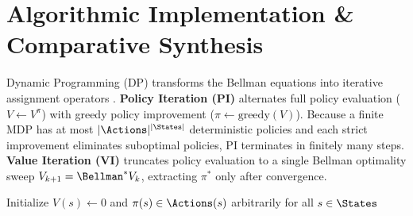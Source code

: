 \documentclass[../../../../master.tex]{subfiles}
\begin{document}
\section{Algorithmic Implementation \& Comparative Synthesis}\label{sec:mdp:algorithms}

Dynamic Programming (DP) transforms the Bellman equations into iterative assignment operators . \textbf{Policy Iteration (PI)} alternates full policy evaluation ($V \leftarrow V^\pi$) with greedy policy improvement ($\pi \leftarrow \mathrm{greedy}(V)$). Because a finite MDP has at most $|\Actions|^{|\States|}$ deterministic policies and each strict improvement eliminates suboptimal policies, PI terminates in finitely many steps. \textbf{Value Iteration (VI)} truncates policy evaluation to a single Bellman optimality sweep $V_{k+1} = \Bellman^* V_k$, extracting $\pi^*$ only after convergence.

\begin{algorithm}[htbp]
\caption{Policy Iteration (PI) with Consistent Tie-Breaking}\label{alg:mdp:policy_iteration}
Initialize $V(s) \leftarrow 0$ and $\pi(s) \in \Actions(s)$ arbitrarily for all $s \in \States$\;
\;
\end{algorithm}
\end{document}
